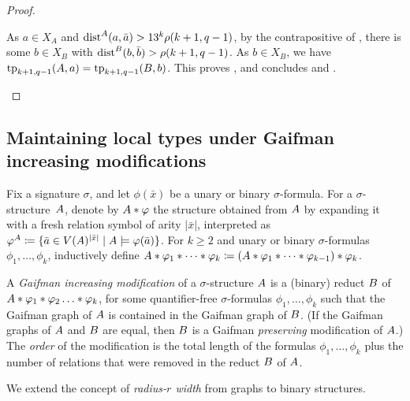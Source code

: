 \begin{proof}
\begin{claimproof}
\begin{enumerate}
    \end{enumerate}
    As $a\in X_A$ and  \(\mathrm{dist}^A(a,\bar a)>13^k \rho(k+1,q-1)\),
    by the contrapositive of ,
    there is some \(b \in X_B\) with \(\mathrm{dist}^B(b,\bar b)>\rho(k+1,q-1)\).
    As $b\in X_B$, we have $\textnormal{tp}_{k+1,q-1}(A,a)=
     \textnormal{tp}_{k+1,q-1}(B,b)$.
    This proves , and concludes  and .
\end{claimproof}
\end{proof}







\subsection{Maintaining local types under Gaifman increasing modifications}\label{sec:updating-local}


Fix a signature $\sigma$, and let 
    $\phi(\bar x)$ be a unary or binary $\sigma$-formula.
    For a $\sigma$-structure~${{A}}$, denote by  ${{A}}\ast \varphi$ the structure
     obtained from ${{A}}$ 
     by expanding it with a fresh relation symbol of arity $|\bar x|$, interpreted as $\varphi^{{{A}}}\coloneqq\{\bar a\in V({{A}})^{|\bar x|}\mid{{A}}\models\varphi(\bar a)\}$.  
     For $k\ge 2$ and unary or binary $\sigma$-formulas $\phi_1,\ldots,\phi_k$,
     inductively define ${{A}}\ast\varphi_1\ast\cdots\ast\varphi_k\coloneqq ({{A}}\ast \varphi_1\ast\cdots\ast\varphi_{k-1})\ast\varphi_k$.

\begin{definition}
     A \emph{Gaifman increasing modification} of a $\sigma$-structure ${{A}}$ 
      is a (binary) reduct ${{B}}$ of ${{A}}\ast \varphi_1\ast\varphi_2\ldots\ast\varphi_k$,
      for some quantifier-free $\sigma$-formulas $\phi_1,\ldots,\phi_k$
      such that the Gaifman graph of ${{A}}$ is contained in the Gaifman graph of  ${{B}}$. (If the Gaifman graphs of ${{A}}$ and ${{B}}$ are equal, then ${{B}}$ is a Gaifman \emph{preserving} modification of ${{A}}$.)
      The \emph{order} of the modification is the total length of the formulas $\phi_1,\ldots,\phi_k$ plus the number of relations that were removed 
      in the reduct ${{B}}$ of ${{A}}$.
  \end{definition}
  
We extend the concept of \emph{radius-\(r\) width} from graphs to binary structures.

